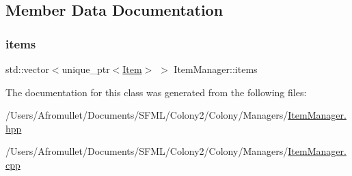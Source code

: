 \subsection{Member Data Documentation}
\mbox{\label{class_item_manager_a67bf78a9baf31874b6cd6309e0d86e1e}} 
\subsubsection{\texorpdfstring{items}{items}}
{\footnotesize\ttfamily std\+::vector$<$unique\+\_\+ptr$<$\mbox{\hyperlink{class_item}{Item}}$>$ $>$ Item\+Manager\+::items\hspace{0.3cm}{\ttfamily [private]}}



The documentation for this class was generated from the following files\+:\begin{DoxyCompactItemize}
\item 
/\+Users/\+Afromullet/\+Documents/\+S\+F\+M\+L/\+Colony2/\+Colony/\+Managers/\mbox{\hyperlink{_item_manager_8hpp}{Item\+Manager.\+hpp}}\item 
/\+Users/\+Afromullet/\+Documents/\+S\+F\+M\+L/\+Colony2/\+Colony/\+Managers/\mbox{\hyperlink{_item_manager_8cpp}{Item\+Manager.\+cpp}}\end{DoxyCompactItemize}
